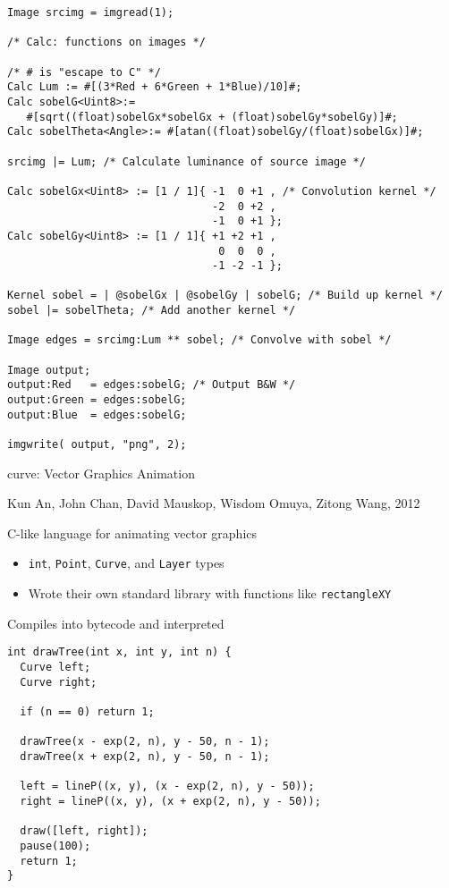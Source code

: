 \documentclass{plt}
\begin{document}
\begin{frame}[fragile]

\fontsize{7.5pt}{7.5pt}\selectfont
\begin{verbatim}
Image srcimg = imgread(1);

/* Calc: functions on images */

/* # is "escape to C" */
Calc Lum := #[(3*Red + 6*Green + 1*Blue)/10]#;
Calc sobelG<Uint8>:=
   #[sqrt((float)sobelGx*sobelGx + (float)sobelGy*sobelGy)]#;
Calc sobelTheta<Angle>:= #[atan((float)sobelGy/(float)sobelGx)]#;

srcimg |= Lum; /* Calculate luminance of source image */

Calc sobelGx<Uint8> := [1 / 1]{ -1  0 +1 , /* Convolution kernel */
                                -2  0 +2 ,
                                -1  0 +1 };
Calc sobelGy<Uint8> := [1 / 1]{ +1 +2 +1 ,
                                 0  0  0 ,
                                -1 -2 -1 };

Kernel sobel = | @sobelGx | @sobelGy | sobelG; /* Build up kernel */
sobel |= sobelTheta; /* Add another kernel */

Image edges = srcimg:Lum ** sobel; /* Convolve with sobel */

Image output;
output:Red   = edges:sobelG; /* Output B&W */
output:Green = edges:sobelG;
output:Blue  = edges:sobelG;

imgwrite( output, "png", 2);
\end{verbatim}

\end{frame}

\begin{frame}{curve: Vector Graphics Animation}

{\small Kun An,
John Chan,
David Mauskop,
Wisdom Omuya,
Zitong Wang, 2012}

C-like language for animating vector graphics

\begin{itemize}
\item \texttt{int}, \texttt{Point}, \texttt{Curve}, and \texttt{Layer} types
\item Wrote their own standard library with functions like \texttt{rectangleXY}
\end{itemize}

Compiles into bytecode and interpreted

\end{frame}

\begin{frame}[fragile]
\fontsize{9pt}{10pt}\selectfont
\begin{verbatim}
int drawTree(int x, int y, int n) {
  Curve left;
  Curve right;

  if (n == 0) return 1;

  drawTree(x - exp(2, n), y - 50, n - 1);
  drawTree(x + exp(2, n), y - 50, n - 1);

  left = lineP((x, y), (x - exp(2, n), y - 50));
  right = lineP((x, y), (x + exp(2, n), y - 50));
  
  draw([left, right]);
  pause(100);
  return 1;
}
\end{verbatim}
\end{frame}
\end{document}
